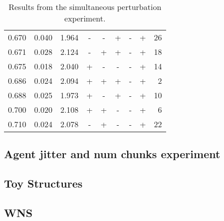 \documentclass[11pt]{article}
\begin{document}
\begin{table}[ht]
\begin{tabular}{rrrcccccr}
  0.670 & 0.040 & 1.964 & - & - & + & - & + & 26 \\ 
  0.671 & 0.028 & 2.124 & - & + & + & - & + & 18 \\ 
  0.675 & 0.018 & 2.040 & + & - & - & - & + & 14 \\ 
  0.686 & 0.024 & 2.094 & + & + & + & - & + & 2 \\ 
  0.688 & 0.025 & 1.973 & + & - & + & - & + & 10 \\ 
  0.700 & 0.020 & 2.108 & + & + & - & - & + & 6 \\ 
  0.710 & 0.024 & 2.078 & - & + & - & - & + & 22 \\ 
   \hline
\end{tabular}
\caption{Results from the simultaneous perturbation experiment.} 
\end{table}




\subsection{Agent jitter and num chunks experiment}
\label{sec-5-2}

\subsection{Toy Structures}
\label{sec-5-3}

\subsection{WNS}
\label{sec-5-4}
\end{document}
